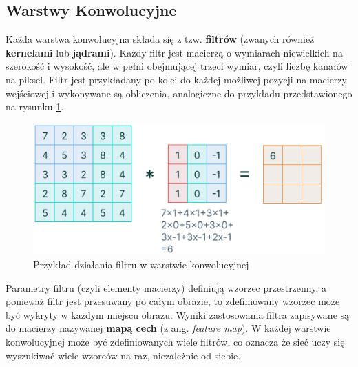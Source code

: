 \subsection{Warstwy Konwolucyjne}
Każda warstwa konwolucyjna składa się z tzw. \textbf{filtrów} (zwanych również \textbf{kernelami} lub \textbf{jądrami}). Każdy filtr jest macierzą o wymiarach niewielkich na szerokość i wysokość, ale w pełni obejmującej trzeci wymiar, czyli liczbę kanałów na piksel. Filtr jest przykładany po kolei do każdej możliwej pozycji na macierzy wejściowej i wykonywane są obliczenia, analogiczne do przykładu przedstawionego na rysunku \ref{ConvLayers}. \\

\begin{figure}[h]
\begin{center}
\includegraphics[width=15cm]{resources/figures/conv-layer.png}
\caption{Przykład działania filtru w warstwie konwolucyjnej}
\label{ConvLayers}
\end{center}
\end{figure}

\vspace{-0.5cm}
Parametry filtru (czyli elementy macierzy) definiują wzorzec przestrzenny, a ponieważ filtr jest przesuwany po całym obrazie, to zdefiniowany wzorzec może być wykryty w każdym miejscu obrazu. Wyniki zastosowania filtra zapisywane są do macierzy nazywanej \textbf{mapą cech} (z ang. \textit{feature map}). W każdej warstwie konwolucyjnej może być zdefiniowanych wiele filtrów, co oznacza że sieć uczy się wyszukiwać wiele wzorców na raz, niezależnie od siebie.

